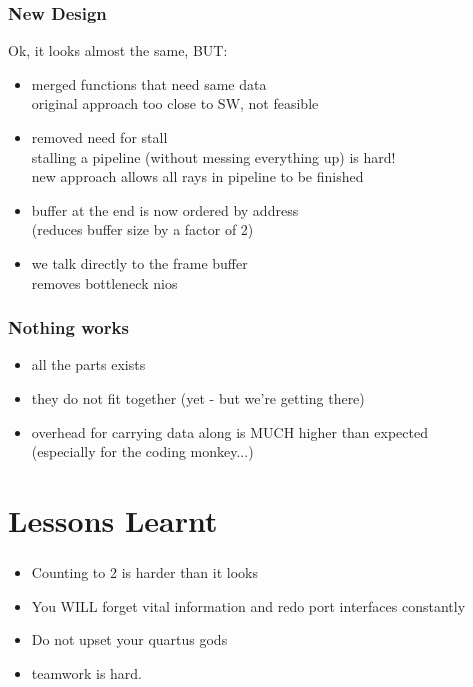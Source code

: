 \documentclass{beamer}
\begin{document}
\begin{frame} %
	\frametitle{New Design} %
	Ok, it looks almost the same, BUT:
	\begin{itemize}
		\item merged functions that need same data\\ \pause
			original approach too close to SW, not feasible
		\pause
		\item removed need for stall\\ \pause
		stalling a pipeline (without messing everything up) is hard!\\ \pause
		new approach allows all rays in pipeline to be finished
		\pause
		\item buffer at the end is now ordered by address\\ \pause  
		(reduces buffer size by a factor of 2)
		\pause
		\item we talk directly to the frame buffer \\ \pause
		removes bottleneck nios
	\end{itemize}
	
\end{frame}

  	\begin{frame} %
	\frametitle{Nothing works} %
	\begin{itemize}
		\item all the parts exists
		\pause
		\item they do not fit together (yet - but we're getting there)
		\pause
		\item overhead for carrying data along is MUCH higher than expected \\
		\pause
		(especially for the coding monkey...)
	\end{itemize}
\end{frame}

\section{Lessons Learnt}

\begin{frame} %
	\frametitle{} %
	\begin{itemize}
		\item Counting to 2 is harder than it looks
		\pause
		\item You WILL forget vital information and redo port interfaces constantly
		\pause
		\item Do not upset your quartus gods
		\pause
		\item teamwork is hard.
	\end{itemize}
\end{frame}
\end{document}
